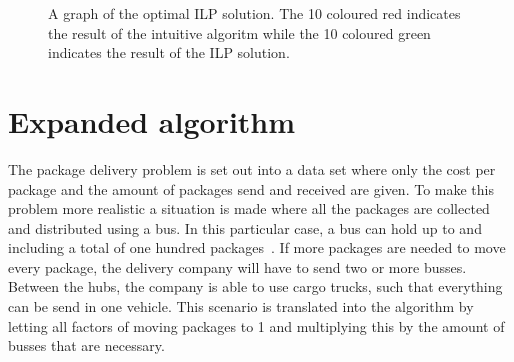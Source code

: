\documentclass{article}
\begin{document}
\begin{figure}[h]

\centering
{}
\caption{A graph of the optimal ILP solution. The 10 coloured red indicates the result of the intuitive algoritm while the 10 coloured green indicates the result of the ILP solution.}
\label{ILPSol}
\end{figure}
\newpage

\section{Expanded algorithm}
The package delivery problem is set out into a data set where only the cost per package and the amount of packages send and received are given. To make this problem more realistic a situation is made where all the packages are collected and distributed using a bus. In this particular case, a bus can hold up to and including a total of one hundred packages~\cite{Packages per bus}. If more packages are needed to move every package, the delivery company will have to send two or more busses. Between the hubs, the company is able to use cargo trucks, such that everything can be send in one vehicle.
This scenario is translated into the algorithm by letting all factors of moving packages to 1 and multiplying this by the amount of busses that are necessary. 
\end{document}
